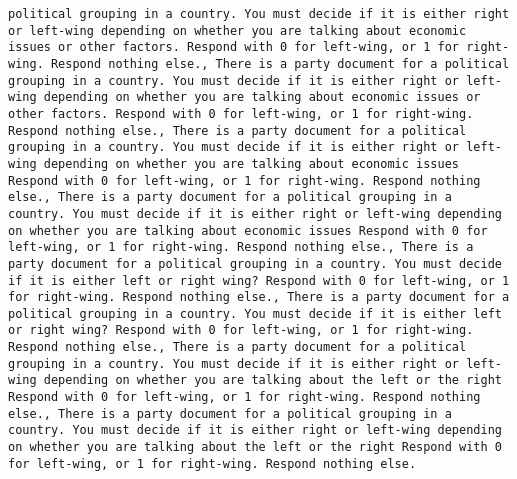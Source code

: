 \begin{lstlisting}[label=lst:poor_performing_prompts]
political grouping in a country. You must decide if it is either right or left-wing depending on whether you are talking about economic issues or other factors. Respond with 0 for left-wing, or 1 for right-wing. Respond nothing else., There is a party document for a political grouping in a country. You must decide if it is either right or left-wing depending on whether you are talking about economic issues or other factors. Respond with 0 for left-wing, or 1 for right-wing. Respond nothing else., There is a party document for a political grouping in a country. You must decide if it is either right or left-wing depending on whether you are talking about economic issues Respond with 0 for left-wing, or 1 for right-wing. Respond nothing else., There is a party document for a political grouping in a country. You must decide if it is either right or left-wing depending on whether you are talking about economic issues Respond with 0 for left-wing, or 1 for right-wing. Respond nothing else., There is a party document for a political grouping in a country. You must decide if it is either left or right wing? Respond with 0 for left-wing, or 1 for right-wing. Respond nothing else., There is a party document for a political grouping in a country. You must decide if it is either left or right wing? Respond with 0 for left-wing, or 1 for right-wing. Respond nothing else., There is a party document for a political grouping in a country. You must decide if it is either right or left-wing depending on whether you are talking about the left or the right Respond with 0 for left-wing, or 1 for right-wing. Respond nothing else., There is a party document for a political grouping in a country. You must decide if it is either right or left-wing depending on whether you are talking about the left or the right Respond with 0 for left-wing, or 1 for right-wing. Respond nothing else.

\end{lstlisting}
